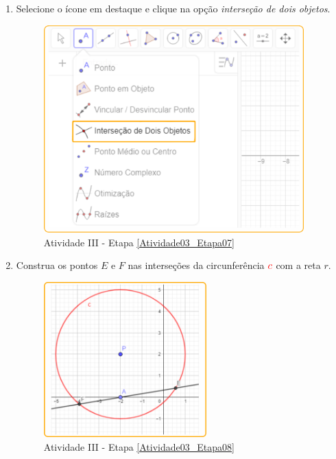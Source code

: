 \documentclass[11pt,a4paper]{article}
\begin{document}
\begin{enumerate}[{Etapa} 1.]
\item Selecione o ícone em destaque e clique na opção {\it interseção de dois objetos}. \label{Atividade03_Etapa07}
\begin{figure}[H]
    \centering
    \includegraphics[height=8cm]{Figuras/T01_Elemento05.png}
    \caption{Atividade III - Etapa \ref{Atividade03_Etapa07}}
    \label{Atividade03_Etapa07_Imagem}
\end{figure}

\item Construa os pontos $E$ e $F$ nas interseções da circunferência ${\color{red}{c}}$ com a reta $r$. \label{Atividade03_Etapa08}
\begin{figure}[H]
    \centering
    \includegraphics[height=6cm]{Figuras/T01_Atividade03_Fig01.png}
    \caption{Atividade III - Etapa \ref{Atividade03_Etapa08}}
    \label{Atividade03_Etapa08_Imagem}
\end{figure}


\end{enumerate}
\end{document}
